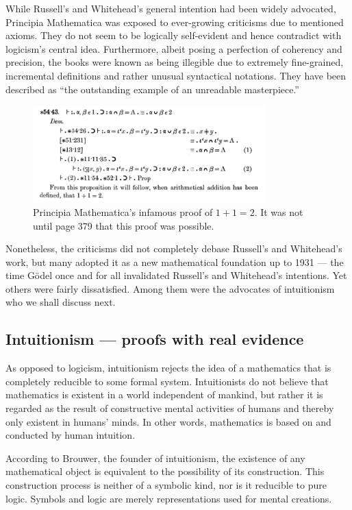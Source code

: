\documentclass[hidelinks]{article}
\begin{document}
While Russell's and Whitehead's general intention had been widely advocated, Principia Mathematica was exposed to ever-growing criticisms due to mentioned axioms. They do not seem to be logically self-evident and hence contradict with logicism's central idea. Furthermore, albeit posing a perfection of coherency and precision, the books were known as being illegible due to extremely fine-grained, incremental definitions and rather unusual syntactical notations. They have been described as ``the outstanding example of an unreadable masterpiece.''\cite[p.~154]{math_experience}

\begin{figure}[h]
	\centering
	\includegraphics[width=0.8\textwidth]{img/principia_mathematica.png}
	\caption{Principia Mathematica's infamous proof of $1+1=2$. It was not until page 379 that this proof was possible.}
\end{figure}

Nonetheless, the criticisms did not completely debase Russell's and Whitehead's work, but many adopted it as a new mathematical foundation up to 1931 --- the time Gödel once and for all invalidated Russell's and Whitehead's intentions. Yet others were fairly dissatisfied. Among them were the advocates of intuitionism who we shall discuss next.

\subsection{Intuitionism --- proofs with real evidence}\label{ssec_intuitionism}
As opposed to logicism, intuitionism rejects the idea of a mathematics that is completely reducible to some formal system. Intuitionists do not believe that mathematics is existent in a world independent of mankind, but rather it is regarded as the result of constructive mental activities of humans and thereby only existent in humans' minds. In other words, mathematics is based on and conducted by human intuition.

According to Brouwer, the founder of intuitionism, the existence of any mathematical object is equivalent to the possibility of its construction. 
This construction process is neither of a symbolic kind, nor is it reducible to pure logic. Symbols and logic are merely representations used for mental creations. 
\end{document}
